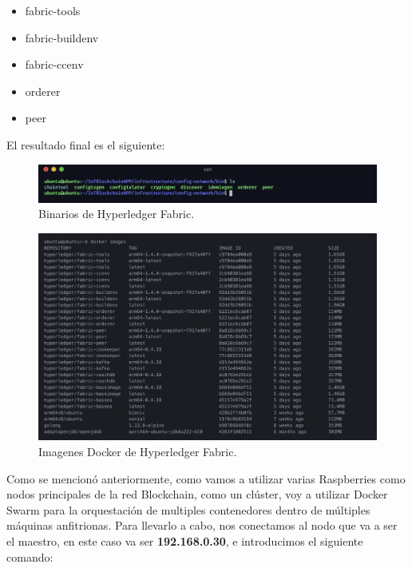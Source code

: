 \begin{itemize}
  \item fabric-tools
  \item fabric-buildenv
  \item fabric-ccenv
  \item orderer
  \item peer
\end{itemize}

\newpage

\noindent El resultado final es el siguiente:

\begin{figure}[ht!]
  \centering
  \includegraphics[width=\textwidth]{imagenes/desarrollo/binarios_fabric}
  \caption{Binarios de Hyperledger Fabric.}
  \label{fig:binarios-fabric}
\end{figure}

\begin{figure}[ht!]
  \centering
  \includegraphics[width=\textwidth]{imagenes/desarrollo/imagenes_docker}
  \caption{Imagenes Docker de Hyperledger Fabric.}
  \label{fig:imagenes-docker}
\end{figure}

\noindent Como se mencionó anteriormente, como vamos a utilizar varias Raspberries como nodos principales de la red 
Blockchain, como un clúster, voy a utilizar Docker Swarm para la orquestación de multiples contenedores dentro de 
múltiples máquinas anfitrionas. Para llevarlo a cabo, nos conectamos al nodo que va a ser el maestro, en este caso va ser 
\textbf{192.168.0.30}, e introducimos el siguiente comando:

